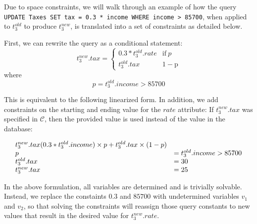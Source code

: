 
Due to space constraints, we will walk through an example of how the query
\texttt{UPDATE Taxes SET tax = 0.3 * income WHERE income > 85700}, when applied to 
$t_3^{old}$ to produce $t_3^{new}$, is translated into a set of constraints
as detailed below.

First, we can rewrite the query as a conditional statement:
\[
t_3^{new}.tax = \begin{cases}
				  0.3*t_3^{old}.rate              & \mathrm{if}\ p  \\
                  t_3^{old}.tax  & \mathrm{1-p}
               \end{cases}
\]
where \[p = t_3^{old}.income > 85700\]

This is equivalent to the following linearized form.
In addition, we add constraints on the starting and ending value for the $rate$ attribute:
If $t_3^{new}.tax$ was specified in $\mathcal{C}$, then the provided value
is used instead of the value in the database:

\[
\begin{array}{l l l}
t_3^{new}.tax (0.3*t_3^{old}.income)\times p + t_3^{old}.tax\times (1-p)\\
p              &= t_3^{old}.income > 85700\\
t_3^{old}.tax &= 30 \\
t_3^{new}.tax &= 25
\end{array}
\]

In the above formulation, all variables are determined and is trivially
solvable.  Instead, we replace
the constaints $0.3$ and $85700$ with undetermined variables $v_1$ and $v_2$,
so that solving the constraints will reassign those query constants 
to new values that result in the desired value for $t_3^{new}.rate$.  
\iffalse
\[
\begin{array}{l l l}
t_3^{new}.tax &= (v_1*t_3^{old}.income)\times p + t_3^{old}.tax\times (1-p)\\
p              &= t_3^{old}.income > v_2\\
t_3^{old}.tax 30 \\
t_3^{new}.tax &= 25 \\
v_1            &\in [minval, maxval]\\
v_2            &\in [minval, maxval]\\
\end{array}
\]
\fi